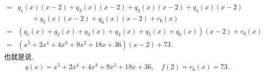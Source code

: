 \begin{example}
\begin{align*}
        = {} & q_1 (x) (x-2) + q_2 (x) (x-2) + q_3 (x) (x-2) + q_4 (x) (x-2)               \\
             & \qquad + q_5 (x) (x-2) + q_6 (x) (x-2) + r_6 (x)                            \\
        = {} & (q_1 (x) + q_2 (x) + q_3 (x) + q_4 (x) + q_5 (x) + q_6 (x)) (x-2) + r_6 (x) \\
        = {} & (x^5 + 2x^4 + 4x^3 + 9x^2 + 18x + 36) (x-2) + 73 \period
    \end{align*}
    也就是说,
    \begin{align*}
        q(x) = x^5 + 2x^4 + 4x^3 + 9x^2 + 18x + 36, \quad f(2) = r_6 (x) = 73 \period
    \end{align*}
\end{example}
